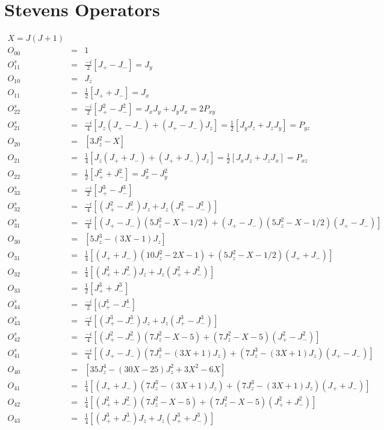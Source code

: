 \section{Stevens Operators}\label{stevens}

\begin{eqnarray*}
X=J(J+1)\\
O_{00}&=&1\\
\hline
O^s_{11}&=&\frac{-i}{2}[J_+-J_-]=J_y \\
O_{10}&=&J_z \\
O_{11}&=&\frac{1}{2}[J_++J_-]=J_x \\
\hline
O^s_{22}&=&\frac{-i}{2}[J_+^2-J_-^2]=J_xJ_y+J_yJ_x=2P_{xy} \\
O^s_{21}&=&\frac{-i}{4}[J_z(J_+-J_-)+(J_+-J_-)J_z]=\frac{1}{2}[J_yJ_z+J_zJ_y]=P_{yz} \\
O_{20}&=&[3J_z^2-X] \\
O_{21}&=&\frac{1}{4}[J_z(J_++J_-)+(J_++J_-)J_z]=\frac{1}{2}[J_xJ_z+J_zJ_x]=P_{xz} \\
O_{22}&=&\frac{1}{2}[J_+^2+J_-^2]=J_x^2-J_y^2 \\
\hline
O^s_{33}&=&\frac{-i}{2}[J_+^3-J_-^3] \\
O^s_{32}&=&\frac{-i}{4}[(J_+^2-J_-^2)J_z+J_z(J_+^2-J_-^2)] \\
O^s_{31}&=&\frac{-i}{4}[(J_+-J_-)(5J_z^2-X-1/2)+(J_+-J_-)(5J_z^2-X-1/2)(J_+-J_-)] \\
O_{30}&=&[5J_z^3-(3X-1)J_z] \\
O_{31}&=&\frac{1}{4}[(J_++J_-)(10J_z^2-2X-1)+(5J_z^2-X-1/2)(J_++J_-)] \\
O_{32}&=&\frac{1}{4}[(J_+^2+J_-^2)J_z+J_z(J_+^2+J_-^2)] \\
O_{33}&=&\frac{1}{2}[J_+^3+J_-^3] \\
\hline
O^s_{44}&=&\frac{-i}{2}[(J_+^4-J_-^4]\\
O^s_{43}&=&\frac{-i}{4}[(J_+^3-J_-^3)J_z+J_z(J_+^3-J_-^3)] \\
O^s_{42}&=&\frac{-i}{4}[(J_+^2-J_-^2)(7J_z^2-X-5)+(7J_z^2-X-5)(J_+^2-J_-^2)] \\
O^s_{41}&=&\frac{-i}{4}[(J_+-J_-)(7J_z^3-(3X+1)J_z)+(7J_z^3-(3X+1)J_z)(J_+-J_-)] \\
O_{40}&=&[35J_z^4-(30X-25)J_z^2+3X^2-6X] \\
O_{41}&=&\frac{1}{4}[(J_++J_-)(7J_z^3-(3X+1)J_z)+(7J_z^3-(3X+1)J_z)(J_++J_-)] \\
O_{42}&=&\frac{1}{4}[(J_+^2+J_-^2)(7J_z^2-X-5)+(7J_z^2-X-5)(J_+^2+J_-^2)] \\
O_{43}&=&\frac{1}{4}[(J_+^3+J_-^3)J_z+J_z(J_+^3+J_-^3)] \\

\end{eqnarray*}
